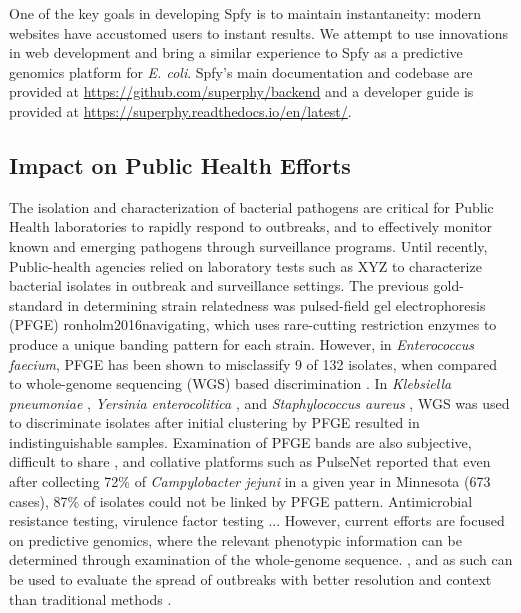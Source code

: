 \documentclass[a4,center,fleqn]{NAR}
\begin{document}
One of the key goals in developing Spfy is to maintain instantaneity: modern websites have accustomed users to instant results.
We attempt to use innovations in web development and bring a similar experience to Spfy as a predictive genomics platform for \textit{E. coli}.
Spfy's main documentation and codebase are provided at \url{https://github.com/superphy/backend} and a developer guide is provided at \url{https://superphy.readthedocs.io/en/latest/}.

\subsection{Impact on Public Health Efforts}

The isolation and characterization of bacterial pathogens are critical for Public Health laboratories to rapidly respond to outbreaks, and to effectively monitor known and emerging pathogens through surveillance programs.
Until recently, Public-health agencies relied on laboratory tests such as XYZ to characterize bacterial isolates in outbreak and surveillance settings.
The previous gold-standard in determining strain relatedness was pulsed-field gel electrophoresis (PFGE) {ronholm2016navigating}, which uses rare-cutting restriction enzymes to produce a unique banding pattern for each strain.
However, in \textit{Enterococcus faecium}, PFGE has been shown to misclassify 9 of 132 isolates, when compared to whole-genome sequencing (WGS) based discrimination \cite{pinholt2015multiple}.
In \textit{Klebsiella pneumoniae} \cite{marsh2015genomic}, \textit{Yersinia enterocolitica} \cite{gilpin2014limitations}, and \textit{Staphylococcus aureus} \cite{doi:10.1093/ofid/ofu096}, WGS was used to discriminate isolates after initial clustering by PFGE resulted in indistinguishable samples.
Examination of PFGE bands are also subjective, difficult to share \cite{lytsy2017time}, and collative platforms such as PulseNet reported \cite{gilpin2014limitations} that even after collecting 72\% of \textit{Campylobacter jejuni} in a given year in Minnesota (673 cases), 87\% of isolates could not be linked by PFGE pattern.
Antimicrobial resistance testing, virulence factor testing ...
However, current efforts are focused on predictive genomics, where the relevant phenotypic information can be determined through examination of the whole-genome sequence. 
, and as such can be used to evaluate the spread of outbreaks with better resolution and context than traditional methods \cite{ronholm2016navigating}.
\end{document}
